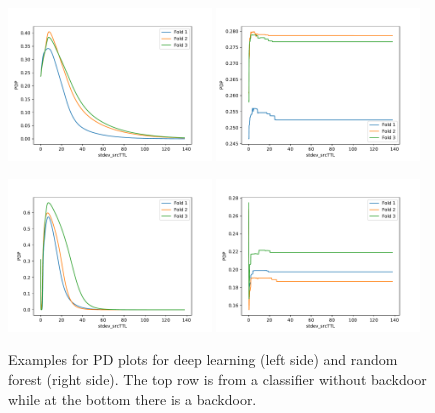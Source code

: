 \documentclass[10pt,sigconf,letterpaper]{acmart}
\begin{document}
\begin{figure}[p]

\includegraphics[width=0.48\textwidth]{../pdp/apply(stdev(ipTTL),forward)_nn.pdf}
\includegraphics[width=0.48\textwidth]{../pdp/apply(stdev(ipTTL),forward)_rf.pdf}

\includegraphics[width=0.48\textwidth]{../pdp/apply(stdev(ipTTL),forward)_nn_bd.pdf}
\includegraphics[width=0.48\textwidth]{../pdp/apply(stdev(ipTTL),forward)_rf_bd.pdf}


\caption{Examples for PD plots for deep learning (left side) and random forest (right side). The top row is from a classifier without backdoor while at the bottom there is a backdoor.}
\label{fig:pdp_backdoor}
\end{figure}
\end{document}
